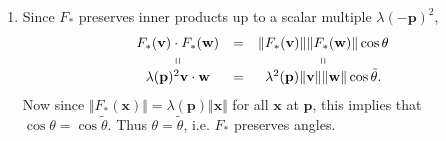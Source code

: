 \documentclass[10pt]{report}
\begin{document}
\begin{enumerate}
	\item Since $F_{*}$ preserves inner products up to a scalar multiple $\lambda(-\mathbf{p})^2$,
		\[
		\begin{matrix}
			F_{*}(\mathbf{v})\cdot F_{*}(\mathbf{w}) & = & {\Vert{F_{*}(\mathbf{v})}\Vert}{\Vert{F_{*}(\mathbf{w})}\Vert}\cos\theta \\
			\shortparallel & & \shortparallel \\
			\lambda(\mathbf{p})^2 \mathbf{v}\cdot \mathbf{w}& = & \lambda^2(\mathbf{p}) {\Vert{\mathbf{v}}\Vert}{\Vert{\mathbf{w}}\Vert}\cos \tilde{\theta}.
		\end{matrix}
		\]
		Now since ${\Vert{F_{*}(\mathbf{x})}\Vert}=\lambda(\mathbf{p}){\Vert{\mathbf{x}}\Vert}$ for all $\mathbf{x}$ at $\mathbf{p}$, this implies that $\cos\theta= \cos\tilde{\theta}$. Thus $\theta=\tilde{\theta}$, i.e. $F_{*}$ preserves angles.
\end{enumerate}
\end{document}
